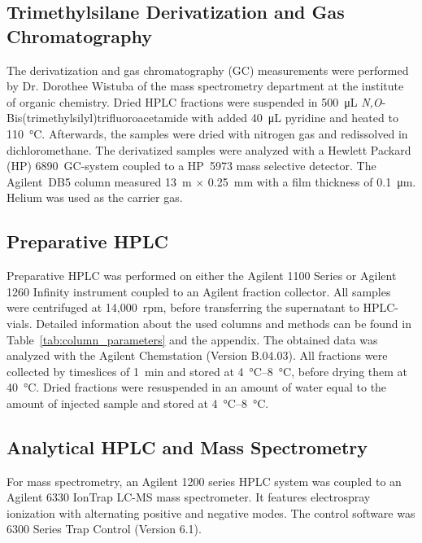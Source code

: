 	\subsection{Trimethylsilane Derivatization and Gas Chromatography} %
	\label{sub:trimethylsilane_derivatization_and_gas_chromatography}
	
	The derivatization and gas chromatography (GC) measurements were performed by Dr. Dorothee Wistuba of the mass spectrometry department at the institute of organic chemistry.
	Dried HPLC fractions were suspended in \SI{500}{\micro\liter} \emph{N,O}-Bis(trimethylsilyl)\-trifluoro\-acetamide with added \SI{40}{\micro\liter} pyridine and heated to \SI{110}{\celsius}. Afterwards, the samples were dried with nitrogen gas and redissolved in dichloromethane.
	The derivatized samples were analyzed with a Hewlett Packard (HP) 6890~GC-system coupled to a HP~5973 mass selective detector. The Agilent~DB5 column measured 13~m $\times$ 0.25~mm with a film thickness of \SI{0.1}{\micro\meter}. Helium was used as the carrier gas.

	\subsection{Preparative HPLC} %
	\label{sub:preparative_hplc}
	
	Preparative HPLC was performed on either the Agilent 1100 Series or Agilent 1260 Infinity instrument coupled to an Agilent  fraction collector. All samples were centrifuged at 14,000~rpm, before transferring the supernatant to HPLC-vials. Detailed information about the used columns and methods can be found in Table~\ref{tab:column_parameters} and the appendix. The obtained data was analyzed with the Agilent Chemstation (Version B.04.03).
	All fractions were collected by timeslices of \SI{1}{\minute} and stored at \SIrange{4}{8}{\celsius}, before drying them at \SI{40}{\celsius}. Dried fractions were resuspended in an amount of water equal to the amount of injected sample and stored at \SIrange{4}{8}{\celsius}.


	\subsection{Analytical HPLC and Mass Spectrometry} %
	\label{sub:analytical_hplc_and_mass_spectrometry}
	

	For mass spectrometry, an Agilent 1200 series HPLC system was coupled to an Agilent 6330 IonTrap LC-MS mass spectrometer. It features electrospray ionization with alternating positive and negative modes. The control software was 6300 Series Trap Control (Version 6.1).

